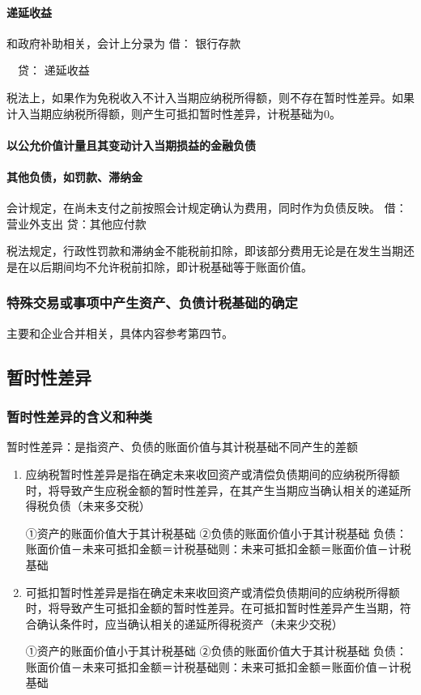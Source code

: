 \documentclass[UTF8,12pt]{ctexart}
\newenvironment{Dr}{\noindent 借：}{\par}
\newenvironment{Cr}{\noindent \ \ 贷：}{\par}
\numberwithin{equation}{section} %
\numberwithin{figure}{section}
\numberwithin{table}{section}
\begin{document}
	\paragraph{递延收益}
	和政府补助相关，会计上分录为
	\begin{Dr}
		银行存款
	\end{Dr}
	\begin{Cr}
		递延收益
	\end{Cr}
	
	税法上，如果作为免税收入不计入当期应纳税所得额，则不存在暂时性差异。如果计入当期应纳税所得额，则产生可抵扣暂时性差异，计税基础为0。
	
	\paragraph{以公允价值计量且其变动计入当期损益的金融负债}
	
	\paragraph{其他负债，如罚款、滞纳金}
	会计规定，在尚未支付之前按照会计规定确认为费用，同时作为负债反映。
	借：营业外支出
	贷：其他应付款
	
	税法规定，行政性罚款和滞纳金不能税前扣除，即该部分费用无论是在发生当期还是在以后期间均不允许税前扣除，即计税基础等于账面价值。
	
	
	\subsubsection{特殊交易或事项中产生资产、负债计税基础的确定}
	主要和企业合并相关，具体内容参考第四节。
	
	\subsection{暂时性差异}
	\subsubsection{暂时性差异的含义和种类}
	暂时性差异：是指资产、负债的账面价值与其计税基础不同产生的差额
	\begin{enumerate}
		\item 应纳税暂时性差异是指在确定未来收回资产或清偿负债期间的应纳税所得额时，将导致产生应税金额的暂时性差异，在其产生当期应当确认相关的递延所得税负债（未来多交税）
		
		①资产的账面价值大于其计税基础
		②负债的账面价值小于其计税基础
		负债：账面价值－未来可抵扣金额＝计税基础则：未来可抵扣金额＝账面价值－计税基础
		
		
		\item 可抵扣暂时性差异是指在确定未来收回资产或清偿负债期间的应纳税所得额时，将导致产生可抵扣金额的暂时性差异。在可抵扣暂时性差异产生当期，符合确认条件时，应当确认相关的递延所得税资产（未来少交税）
		
		①资产的账面价值小于其计税基础
		②负债的账面价值大于其计税基础
		负债：账面价值－未来可抵扣金额＝计税基础则：未来可抵扣金额＝账面价值－计税基础
		
	\end{enumerate}
\end{document}
